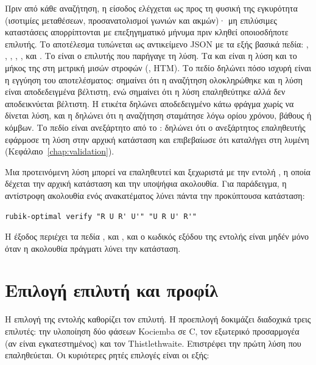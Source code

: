 Πριν από κάθε αναζήτηση, η είσοδος ελέγχεται ως προς τη φυσική της εγκυρότητα (ισοτιμίες μεταθέσεων, προσανατολισμοί γωνιών και ακμών)· μη επιλύσιμες καταστάσεις απορρίπτονται με επεξηγηματικό μήνυμα πριν κληθεί οποιοσδήποτε επιλυτής. Το αποτέλεσμα τυπώνεται ως αντικείμενο JSON με τα εξής βασικά πεδία: , , , , ,  και . Το  είναι ο επιλυτής που παρήγαγε τη λύση. Τα  και  είναι η λύση και το μήκος της στη μετρική μισών στροφών (, HTM). Το πεδίο  δηλώνει πόσο ισχυρή είναι η εγγύηση του αποτελέσματος:  σημαίνει ότι η αναζήτηση ολοκληρώθηκε και η λύση είναι αποδεδειγμένα βέλτιστη, ενώ  σημαίνει ότι η λύση επαληθεύτηκε αλλά δεν αποδεικνύεται βέλτιστη. Η ετικέτα  δηλώνει αποδεδειγμένο κάτω φράγμα χωρίς να δίνεται λύση, και η  δηλώνει ότι η αναζήτηση σταμάτησε λόγω ορίου χρόνου, βάθους ή κόμβων. Το πεδίο  είναι ανεξάρτητο από το : δηλώνει ότι ο ανεξάρτητος επαληθευτής εφάρμοσε τη λύση στην αρχική κατάσταση και επιβεβαίωσε ότι καταλήγει στη λυμένη (Κεφάλαιο~\ref{chap:validation}).

Μια προτεινόμενη λύση μπορεί να επαληθευτεί και ξεχωριστά με την εντολή , η οποία δέχεται την αρχική κατάσταση και την υποψήφια ακολουθία. Για παράδειγμα, η αντίστροφη ακολουθία ενός ανακατέματος λύνει πάντα την προκύπτουσα κατάσταση:

\begin{verbatim}
rubik-optimal verify "R U R' U'" "U R U' R'"
\end{verbatim}

Η έξοδος περιέχει τα πεδία ,  και , και ο κωδικός εξόδου της εντολής είναι μηδέν μόνο όταν η ακολουθία πράγματι λύνει την κατάσταση.

\section{Επιλογή επιλυτή και προφίλ}
\label{sec:usage-solvers}

Η επιλογή  της εντολής  καθορίζει τον επιλυτή. Η προεπιλογή  δοκιμάζει διαδοχικά τρεις επιλυτές: την υλοποίηση δύο φάσεων Kociemba σε C, τον εξωτερικό προσαρμογέα  (αν είναι εγκατεστημένος) και τον Thistlethwaite. Επιστρέφει την πρώτη λύση που επαληθεύεται. Οι κυριότερες ρητές επιλογές είναι οι εξής:

